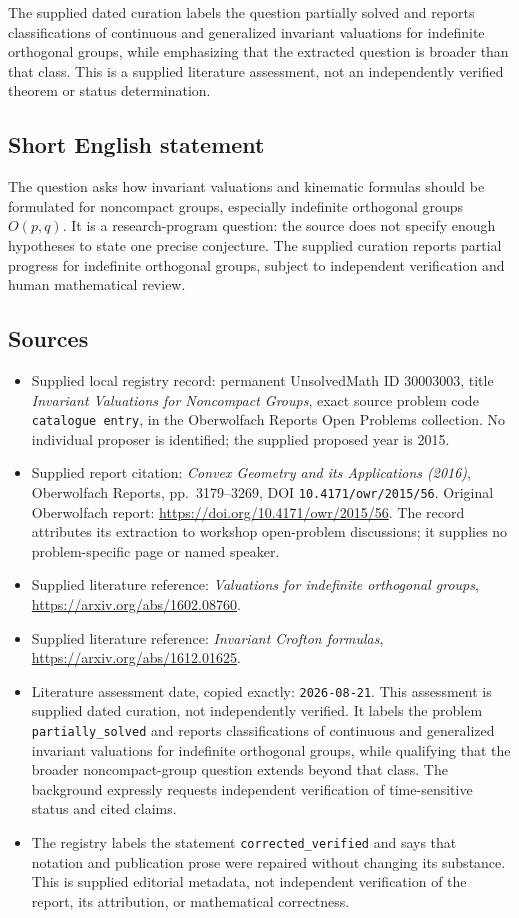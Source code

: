\documentclass[11pt]{article}
\begin{document}
The supplied dated curation labels the question partially solved and reports classifications of continuous and generalized invariant valuations for indefinite orthogonal groups, while emphasizing that the extracted question is broader than that class. This is a supplied literature assessment, not an independently verified theorem or status determination.
\subsection{Short English statement}
The question asks how invariant valuations and kinematic formulas should be formulated for noncompact groups, especially indefinite orthogonal groups \(O(p,q)\). It is a research-program question: the source does not specify enough hypotheses to state one precise conjecture. The supplied curation reports partial progress for indefinite orthogonal groups, subject to independent verification and human mathematical review.
\subsection{Sources}
\begin{itemize}
\item Supplied local registry record: permanent UnsolvedMath ID \(30003003\), title \emph{Invariant Valuations for Noncompact Groups}, exact source problem code \texttt{catalogue entry}, in the Oberwolfach Reports Open Problems collection. No individual proposer is identified; the supplied proposed year is 2015.
\item Supplied report citation: \emph{Convex Geometry and its Applications (2016)}, Oberwolfach Reports, pp.\ 3179--3269, DOI \texttt{10.4171/owr/2015/56}. Original Oberwolfach report: \url{https://doi.org/10.4171/owr/2015/56}. The record attributes its extraction to workshop open-problem discussions; it supplies no problem-specific page or named speaker.
\item Supplied literature reference: \emph{Valuations for indefinite orthogonal groups}, \url{https://arxiv.org/abs/1602.08760}.
\item Supplied literature reference: \emph{Invariant Crofton formulas}, \url{https://arxiv.org/abs/1612.01625}.
\item Literature assessment date, copied exactly: \texttt{2026-08-21}. This assessment is supplied dated curation, not independently verified. It labels the problem \texttt{partially\_solved} and reports classifications of continuous and generalized invariant valuations for indefinite orthogonal groups, while qualifying that the broader noncompact-group question extends beyond that class. The background expressly requests independent verification of time-sensitive status and cited claims.
\item The registry labels the statement \texttt{corrected\_verified} and says that notation and publication prose were repaired without changing its substance. This is supplied editorial metadata, not independent verification of the report, its attribution, or mathematical correctness.
\end{itemize}
\end{document}

